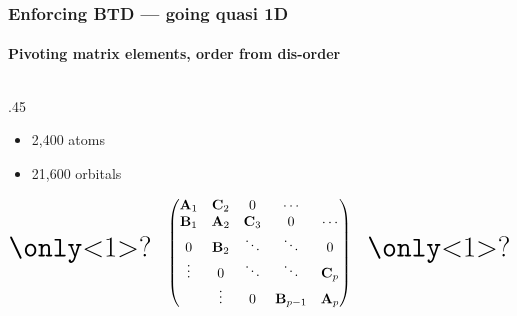 \begin{frame}
  \frametitle{Enforcing BTD --- going quasi 1D}
  \framesubtitle{Pivoting matrix elements, order from dis-order}

  \begin{columns}
    \begin{column}{.45\linewidth}
      \begin{itemize}
        \item 2,400 atoms
        \item 21,600 orbitals
      \end{itemize}

      \small
      \begin{equation*}
        \text{\huge \only<1>{?}}\quad
        \begin{pmatrix}
          \mathbf A_1 & \mathbf C_2 & 0 & \cdots & \\
          \mathbf B_1 & \mathbf A_2 & \mathbf C_3 & 0& \cdots \\
          0 & \mathbf B_2 &\ddots & \ddots & 0 \\
          \vdots & 0  & \ddots &  \ddots & \mathbf C_p \\
          & \vdots  & 0  & \mathbf B_{p-1} & \mathbf A_p\\
        \end{pmatrix}\quad\text{\huge \only<1>{?}}
      \end{equation*}


\end{column}
\end{columns}
\end{frame}
